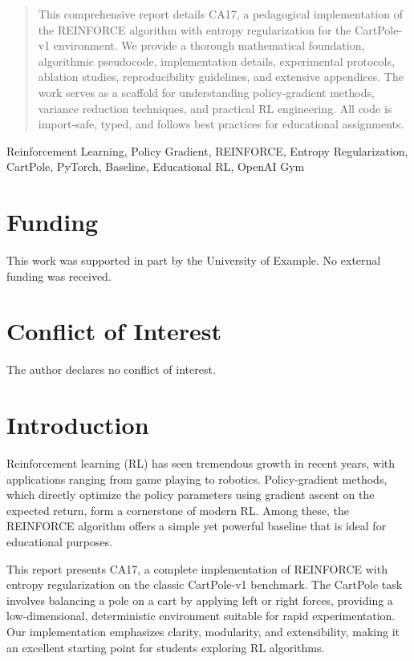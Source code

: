 \documentclass[conference]{IEEEtran}
\author{\IEEEauthorblockN{Student Name}
\IEEEauthorblockA{Department of Computer Science\\University of Example\\student@example.com}
}
\begin{document}
\maketitle

\begin{abstract}
This comprehensive report details CA17, a pedagogical implementation of the REINFORCE algorithm with entropy regularization for the CartPole-v1 environment. We provide a thorough mathematical foundation, algorithmic pseudocode, implementation details, experimental protocols, ablation studies, reproducibility guidelines, and extensive appendices. The work serves as a scaffold for understanding policy-gradient methods, variance reduction techniques, and practical RL engineering. All code is import-safe, typed, and follows best practices for educational assignments.
\end{abstract}

\begin{IEEEkeywords}
Reinforcement Learning, Policy Gradient, REINFORCE, Entropy Regularization, CartPole, PyTorch, Baseline, Educational RL, OpenAI Gym
\end{IEEEkeywords}

\section*{Funding}
This work was supported in part by the University of Example. No external funding was received.

\section*{Conflict of Interest}
The author declares no conflict of interest.



\section{Introduction}
\label{sec:intro}

Reinforcement learning (RL) has seen tremendous growth in recent years, with applications ranging from game playing to robotics. Policy-gradient methods, which directly optimize the policy parameters using gradient ascent on the expected return, form a cornerstone of modern RL. Among these, the REINFORCE algorithm \cite{williams1992simple} offers a simple yet powerful baseline that is ideal for educational purposes.

This report presents CA17, a complete implementation of REINFORCE with entropy regularization on the classic CartPole-v1 benchmark. The CartPole task involves balancing a pole on a cart by applying left or right forces, providing a low-dimensional, deterministic environment suitable for rapid experimentation. Our implementation emphasizes clarity, modularity, and extensibility, making it an excellent starting point for students exploring RL algorithms.
\end{document}
